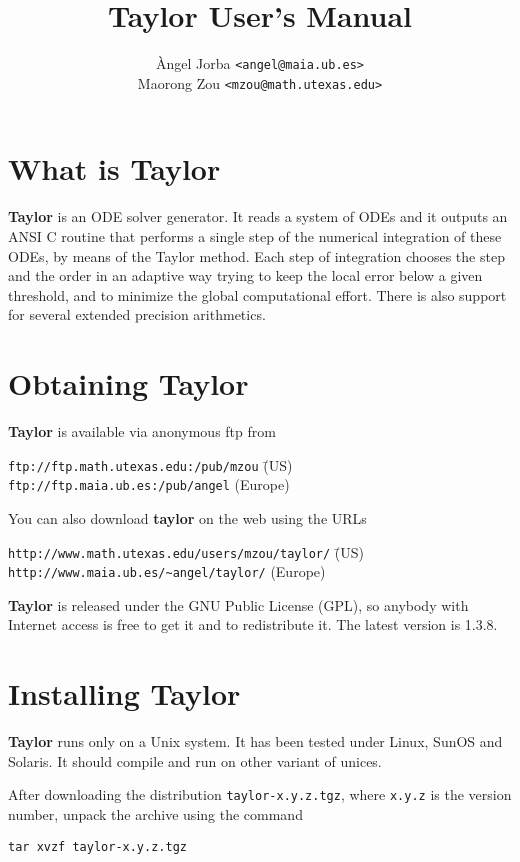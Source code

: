 \documentclass{article}
\title{{\bf Taylor} User's Manual }
\author{\`Angel Jorba {\tt <angel@maia.ub.es>} \\
Maorong Zou {\tt <mzou@math.utexas.edu>}}
\begin{document}
\maketitle

\section{What is Taylor}
{\bf Taylor} is an ODE solver generator. It reads a system of ODEs and
it outputs an ANSI C routine that performs a single step of the
numerical integration of these ODEs, by means of the Taylor
method. Each step of integration chooses the step and the order in an
adaptive way trying to keep the local error below a given threshold,
and to minimize the global computational effort. There is also support
for several extended precision arithmetics.


\section{Obtaining Taylor}
{\bf Taylor} is available via anonymous ftp from
\begin{tabbing}
{\tt ftp://ftp.math.utexas.edu:/pub/mzou}\hspace*{5mm} \= (US) \\
{\tt ftp://ftp.maia.ub.es:/pub/angel} \> (Europe)
\end{tabbing}
You can also download {\bf taylor} on the web
using the URLs
\begin{tabbing}
{\tt http://www.math.utexas.edu/users/mzou/taylor/}\hspace*{5mm} \= (US)\\
{\verb-http://www.maia.ub.es/~angel/taylor/-} \> (Europe)
\end{tabbing}
{\bf Taylor} is released under the GNU Public License (GPL), so
anybody with Internet access is free to get it and to redistribute it.
The latest version is 1.3.8.

\section{Installing Taylor}
{\bf Taylor} runs only on a Unix system. It has been tested
under Linux, SunOS and Solaris. It should compile and run
on other variant of unices.

After downloading the distribution {\tt taylor-x.y.z.tgz},
where {\tt x.y.z} is the version number,
unpack the archive using the command

{\tt tar xvzf taylor-x.y.z.tgz}
\end{document}
